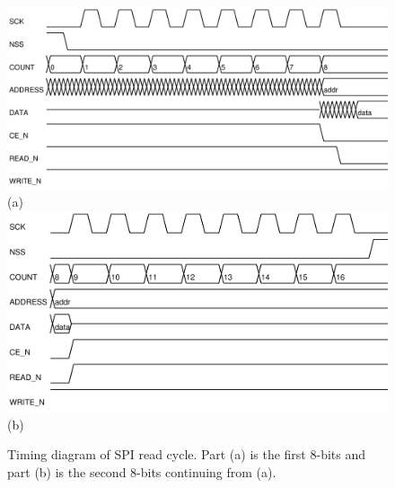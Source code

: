 \documentclass{article}
\begin{document}
\begin{figure}
\center
\includegraphics[scale=0.7]{figures/spi_ctl-timing/read-byte1} \\
(a) \\
\includegraphics[scale=0.7]{figures/spi_ctl-timing/read-byte2} \\
(b)
\caption{Timing diagram of SPI read cycle.
Part (a) is the first 8-bits and part (b) is the second
8-bits continuing from (a).}
\label{fig:spi_read}
\end{figure}
\end{document}
